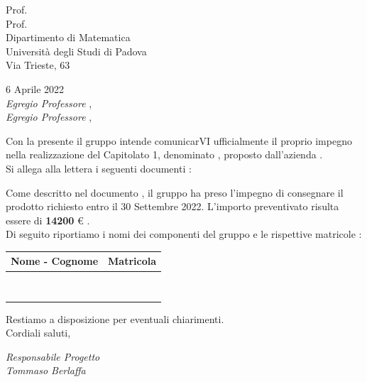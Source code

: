 	\begin{flushright}
		Prof. \Tullio					\\
		Prof. \Ric 						\\
		Dipartimento di Matematica  	\\
		Università degli Studi di Padova\\
		Via Trieste, 63					
	\end{flushright}
	
	\begin{flushleft}
		6 Aprile 2022					\\
		\textit{Egregio Professore \Tullio}, \\
		\textit{Egregio Professore \Ric}, 
	\end{flushleft}
		Con la presente il gruppo \textit{\docNomeTeam} intende comunicarVI ufficialmente il proprio impegno nella realizzazione del Capitolato 1, denominato \textit{\prog}, proposto dall'azienda \textit{\azienda}.\\
		Si allega alla lettera i seguenti documenti :
	
		\documenti
		
		Come descritto nel documento \can, il gruppo \textit{\docNomeTeam} ha preso l'impegno di consegnare il prodotto richiesto entro il 30 Settembre 2022.
		L'importo preventivato risulta essere di \textbf{14200 }€ .
		\\
		\newpage
		Di seguito riportiamo i nomi dei componenti del gruppo e le rispettive matricole :
		\begin{table}[htb]
			\centering
				\begin{tabular} { c c }
					Nome - Cognome & Matricola 		\\
					\hline \hline					\\
					\Ire 	& \MIre					\\
					\Tom 	& \MTom					\\
					\MatE 	& \MMatE				\\
					\Pie 	& \MPie					\\
					\Andre	& \MAndre				\\
					\MatP 	& \MMatP				\\
					\Sam 	& \MSam					\\
				\end{tabular}
		\end{table}
	 
		\begin{flushleft}										
			Restiamo a disposizione per eventuali chiarimenti.		\\
			Cordiali saluti,
		\end{flushleft} 
	
		\begin{flushright}
			\textit{Responsabile Progetto} \\
			\textit{Tommaso Berlaffa}\\
		\end{flushright}
	\thispagestyle{empty}   
